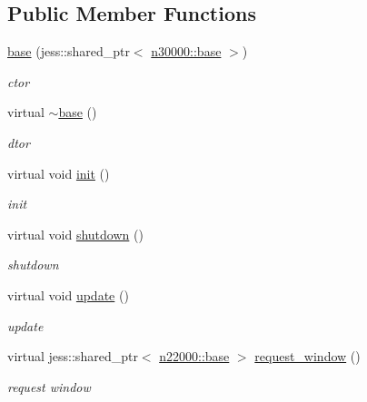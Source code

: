 \subsection*{Public Member Functions}
\begin{DoxyCompactItemize}
\item 
\hyperlink{classnebula_1_1content_1_1universe_1_1admin_1_1base_a51a5e35a87bec6f83bf42ce118011fda}{base} (jess::shared\_\-ptr$<$ \hyperlink{classnebula_1_1content_1_1base}{n30000::base} $>$)
\begin{DoxyCompactList}\small\item\em ctor \item\end{DoxyCompactList}\item 
virtual \hyperlink{classnebula_1_1content_1_1universe_1_1admin_1_1base_a6982e2e195385a8a9452c457566decbc}{$\sim$base} ()
\begin{DoxyCompactList}\small\item\em dtor \item\end{DoxyCompactList}\item 
virtual void \hyperlink{classnebula_1_1content_1_1universe_1_1admin_1_1base_a9f4f3553a746519a33bc9357880c200c}{init} ()
\begin{DoxyCompactList}\small\item\em init \item\end{DoxyCompactList}\item 
virtual void \hyperlink{classnebula_1_1content_1_1universe_1_1admin_1_1base_ad7a45a5bd4f97fb70f65fcb400454eee}{shutdown} ()
\begin{DoxyCompactList}\small\item\em shutdown \item\end{DoxyCompactList}\item 
virtual void \hyperlink{classnebula_1_1content_1_1universe_1_1admin_1_1base_aa8a9cc5f94b9d0f4eda45c6d8843a242}{update} ()
\begin{DoxyCompactList}\small\item\em update \item\end{DoxyCompactList}\item 
virtual jess::shared\_\-ptr$<$ \hyperlink{classnebula_1_1platform_1_1window_1_1base}{n22000::base} $>$ \hyperlink{classnebula_1_1content_1_1universe_1_1admin_1_1base_af02d79b18b21c674517ab21ad9ab7e97}{request\_\-window} ()
\begin{DoxyCompactList}\small\item\em request window \item\end{DoxyCompactList}\item 

\end{DoxyCompactItemize}
